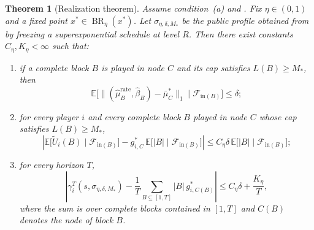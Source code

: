 \documentclass[12pt]{article}
\newtheorem{theorem}{Theorem}[section]
\theoremstyle{definition}
\newcommand{\E}{\mathbb{E}}
\newcommand{\1}{\mathbf{1}}
\newcommand{\cF}{\mathcal{F}}
\DeclareMathOperator{\BR}{BR}
\begin{document}
\begin{theorem}[Realization theorem]
\label{thm:realization}
Assume condition~\textnormal{(a)} and . Fix
$\eta\in(0,1)$ and a fixed point $x^*\in\BR_\eta(x^*)$. Let
$\sigma_{\eta,\delta,M_*}$ be the public profile obtained from
 by freezing a superexponential schedule at level $R$.
Then there exist constants $C_\eta,K_\eta<\infty$ such that:
\begin{enumerate}[label=\textnormal{(Q\arabic*)},leftmargin=2.8em]
\item if a complete block $B$ is played in node $C$ and its cap satisfies
$L(B)\ge M_*$, then
\begin{equation}
\label{eq:block-occupation-realization}
\E\bigl[\|(\widehat\mu_B^{\mathrm{rate}},\widehat\beta_B)-\bar\mu_C^*\|_1
\mid \cF_{\mathrm{in}(B)}\bigr]
\le \delta;
\end{equation}
\item for every player $i$ and every complete block $B$ played in node $C$
whose cap satisfies $L(B)\ge M_*$,
\begin{equation}
\label{eq:block-payoff-realization}
\left|
\E\bigl[\widetilde U_i(B)\mid \cF_{\mathrm{in}(B)}\bigr]
-
g_{i,C}^*\,\E\bigl[|B|\mid \cF_{\mathrm{in}(B)}\bigr]
\right|
\le C_\eta\delta\,\E\bigl[|B|\mid \cF_{\mathrm{in}(B)}\bigr];
\end{equation}
\item for every horizon $T$,
\begin{equation}
\label{eq:realization-tail-bound}
\left|
\gamma_i^T(s,\sigma_{\eta,\delta,M_*})
-
\frac1T\sum_{B\subseteq [1,T]} |B|\,g_{i,C(B)}^*
\right|
\le C_\eta\delta + \frac{K_\eta}{T},
\end{equation}
where the sum is over complete blocks contained in $[1,T]$ and $C(B)$ denotes the
node of block $B$.
\end{enumerate}
\end{theorem}
\end{document}
